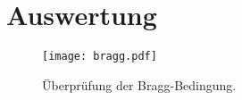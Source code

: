 \section{Auswertung}
\label{sec:Auswertung}

\begin{figure}
  \centering
  \texttt{[image: bragg.pdf]}
  \caption{Überprüfung der Bragg-Bedingung.}
  \label{fig:bragg}
\end{figure}
